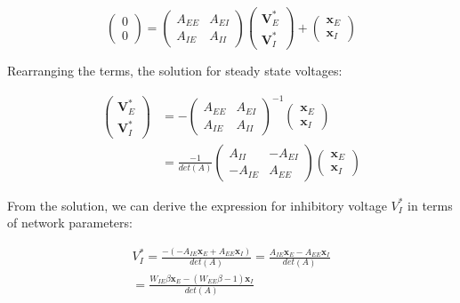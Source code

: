 \documentclass[10pt,twocolumn]{article}
\begin{document}
$$
    \begin{pmatrix}
        0 \\ 0
    \end{pmatrix}
    =
    \begin{pmatrix}
        A_{EE} & A_{EI} \\
        A_{IE} & A_{II}
    \end{pmatrix}
    \begin{pmatrix}
        \textbf{V}^\ast_E \\ \textbf{V}^\ast_I
    \end{pmatrix}+
    \begin{pmatrix}
        \textbf{x}_E \\ \textbf{x}_I
    \end{pmatrix}
$$

Rearranging the terms, the solution for steady state voltages:

$$
    \begin{align*}
        \begin{pmatrix}
            \textbf{V}^\ast_E \\ \textbf{V}^\ast_I
        \end{pmatrix}
         & =
        -\begin{pmatrix}
             A_{EE} & A_{EI} \\
             A_{IE} & A_{II}
         \end{pmatrix}^{-1}
        \begin{pmatrix}
            \textbf{x}_E \\ \textbf{x}_I
        \end{pmatrix} \\
         & =
        \frac{-1}{det(A)}
        \begin{pmatrix}
            A_{II}  & -A_{EI} \\
            -A_{IE} & A_{EE}
        \end{pmatrix}
        \begin{pmatrix}
            \textbf{x}_E \\ \textbf{x}_I
        \end{pmatrix}
    \end{align*}
$$

From the solution, we can derive the expression for
inhibitory voltage $V^\ast_I$ in terms of network parameters:

$$
    \begin{align*}
        V^\ast_I
        = \frac{-(- A_{IE}\textbf{x}_E + A_{EE}\textbf{x}_I)}{det(A)}
        = \frac{A_{IE}\textbf{x}_E - A_{EE}\textbf{x}_I}{det(A)}
        \\
        = \frac{W_{IE}\beta \textbf{x}_E - (W_{EE}\beta - 1) \textbf{x}_I}{det(A)}
    \end{align*}
$$
\end{document}
